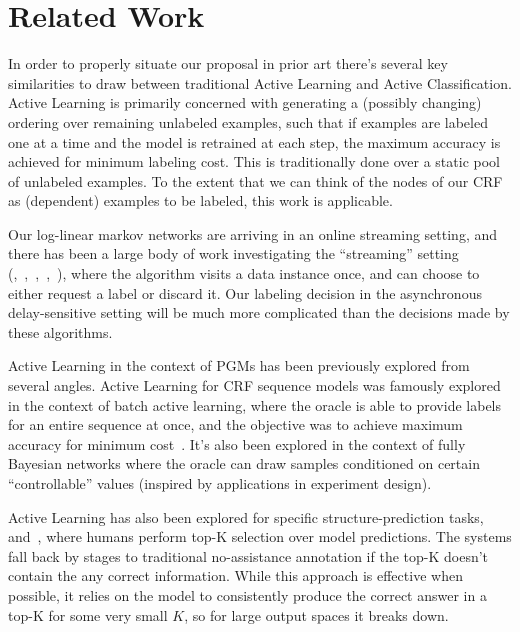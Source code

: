\section{Related Work}
\label{sec:related}

In order to properly situate our proposal in prior art there's several key similarities to draw between traditional Active Learning and Active Classification.
 Active Learning is primarily concerned with generating a (possibly changing) ordering over remaining unlabeled examples, such that if examples are labeled one at a time and the model is retrained at each step, the maximum accuracy is achieved for minimum labeling cost.
 This is traditionally done over a static pool of unlabeled examples.
 To the extent that we can think of the nodes of our CRF as (dependent) examples to be labeled, this work is applicable.
 

Our log-linear markov networks are arriving in an online streaming setting, and there has been a large body of work investigating the ``streaming'' setting (\cite{chu2011unbiased},~\cite{agarwal2013selective},~\cite{cheng2013feedback},~\cite{vzliobaite2011active},~\cite{helmbold1997some}), where the algorithm visits a data instance once, and can choose to either request a label or discard it.
 Our labeling decision in the asynchronous delay-sensitive setting will be much more complicated than the decisions made by these algorithms.


Active Learning in the context of PGMs has been previously explored from several angles.
 Active Learning for CRF sequence models was famously explored in the context of batch active learning, where the oracle is able to provide labels for an entire sequence at once, and the objective was to achieve maximum accuracy for minimum cost~\cite{settles2008analysis}.
 It's also been explored in the context of fully Bayesian networks where the oracle\cite{tong2000active} can draw samples conditioned on certain ``controllable'' values (inspired by applications in experiment design).
 

Active Learning has also been explored for specific structure-prediction tasks,~\cite{roth2006active} and~\cite{culotta2005reducing}, where humans perform top-K selection over model predictions.
 The systems fall back by stages to traditional no-assistance annotation if the top-K doesn't contain the any correct information.
 While this approach is effective when possible, it relies on the model to consistently produce the correct answer in a top-K for some very small $K$, so for large output spaces it breaks down.


